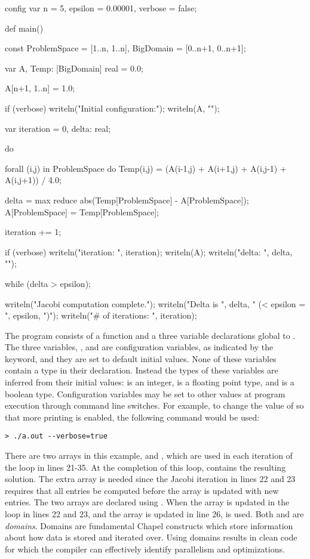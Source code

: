 \begin{numberedchapel}
config var n = 5,
           epsilon = 0.00001,
           verbose = false;

def main() {
  const ProblemSpace = [1..n, 1..n],
        BigDomain = [0..n+1, 0..n+1];

  var A, Temp: [BigDomain] real = 0.0;

  A[n+1, 1..n] = 1.0;

  if (verbose) {
    writeln("Initial configuration:");
    writeln(A, "\n");
  }

  var iteration = 0,
      delta: real;

  do {
    forall (i,j) in ProblemSpace do
      Temp(i,j) = (A(i-1,j) + A(i+1,j) + A(i,j-1) + A(i,j+1)) / 4.0;

    delta = max reduce abs(Temp[ProblemSpace] - A[ProblemSpace]);
    A[ProblemSpace] = Temp[ProblemSpace];

    iteration += 1;

    if (verbose) {
      writeln("iteration: ", iteration);
      writeln(A);
      writeln("delta: ", delta, "\n");
    }
  } while (delta > epsilon);

  writeln("Jacobi computation complete.");
  writeln("Delta is ", delta, " (< epsilon = ", epsilon, ")");
  writeln("# of iterations: ", iteration);
}
\end{numberedchapel}

The program consists of a  function and a three variable declarations
global to .  The three variables, ,  and
 are configuration variables, as indicated by the 
keyword, and they are set to default initial values.  None of these variables
contain a type in their declaration.  Instead the types of these variables are
inferred from their initial values:   is an integer,  is
a floating point type, and  is a boolean type.  Configuration 
variables may be set 
to other values at program execution through command line switches.  For example,
to change the value of  so that more printing is enabled, 
the following command would be used:
\begin{verbatim}
> ./a.out --verbose=true
\end{verbatim}  

There are two arrays in this example,  and ,  
which are used in each iteration of the  loop in lines 21-35.  
At the completion of this loop,  contains the resulting solution.
The extra  array is needed since the Jacobi iteration in lines 22 and 23 
requires that 
all entries be computed before the array is updated with new entries.  
The two arrays are declared using .  
When the  array is updated in the  loop in lines 22 and 23, 
and the  array is updated in line 26,  is used.  
Both  and  are {\em domains}.  
Domains are fundamental Chapel constructs which store information about how data
is stored and iterated over.  Using domains results in clean code for which the 
compiler can effectively identify parallelism and optimizations.  

